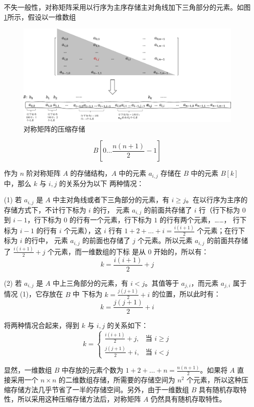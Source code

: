 \documentclass[lang=cn,newtx,10pt,scheme=chinese]{../elegantbook}
\begin{document}
不失一般性，对称矩阵采用以行序为主序存储主对角线加下三角部分的元素。如图\ref{fig:downMatrix}所示，假设以一维数组

\begin{figure}
  \centering
  \includegraphics[width=1\textwidth]{./figure/pdf/cropped/downMatrix.pdf}
  \caption{对称矩阵的压缩存储}
  \label{fig:downMatrix}
\end{figure}
\[
B[0 \dots \frac{n(n+1)}{2} - 1]
\]

作为 $n$ 阶对称矩阵 $A$ 的存储结构，$A$ 中的元素 $a_{i,j}$ 存储在 $B$ 中的元素 $B[k]$ 中，那么 $k$ 与 $i,j$ 的关系分为以下
两种情况：

(1) 若 $a_{i,j}$ 是 $A$ 中主对角线或者下三角部分的元素，有 $i \geq j$。在以行序为主序的存储方式下，不计行下标为 $i$ 的行，
元素 $a_{i,j}$ 的前面共存储了 $i$ 行（行下标为 $0$ 到 $i-1$，行下标为 $0$ 的行有一个元素，行下标为 $1$ 的行有两个元素，……，
行下标为 $i-1$ 的行有 $i$ 个元素），这 $i$ 行有 $1 + 2 + \dots + i = \frac{i(i+1)}{2}$ 个元素；在行下标为 $i$ 的行中，
元素 $a_{i,j}$ 的前面也存储了 $j$ 个元素。所以元素 $a_{i,j}$ 的前面共存储了 $\frac{i(i+1)}{2} + j$ 个元素，而一维数组的下标
是从 $0$ 开始的，所以有：
\[
k = \frac{i(i+1)}{2} + j
\]

(2) 若 $a_{i,j}$ 是 $A$ 中上三角部分的元素，有 $i < j$。其值等于 $a_{j,i}$，而元素 $a_{j,i}$ 属于情况 (1)，它存放在 $B$ 中
下标为 $k = \frac{j(j+1)}{2} + i$ 的位置，所以此时有：
\[
k = \frac{j(j+1)}{2} + i
\]

将两种情况合起来，得到 $k$ 与 $i,j$ 的关系如下：
\[
k =
\begin{cases} 
\frac{i(i+1)}{2} + j, & \text{当 } i \geq j \\ 
\frac{j(j+1)}{2} + i, & \text{当 } i < j 
\end{cases}
\]

显然，一维数组 $B$ 中存放的元素个数为 $1 + 2 + \dots + n = \frac{n(n+1)}{2}$。如果将 $A$ 直接采用一个 $n \times n$ 的二维数组存储，所需要的存储空间为 $n^2$ 个元素，所以这种压缩存储方法几乎节省了一半的存储空间。另外，由于一维数组 $B$ 具有随机存取特性，所以采用这种压缩存储方法后，对称矩阵 $A$ 仍然具有随机存取特性。
\end{document}
